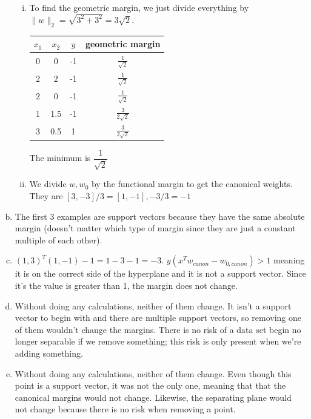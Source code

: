 \documentclass[12pt]{article}
\begin{document}
\begin{enumerate}[(a)]
\begin{enumerate}[i.]
			\item To find the geometric margin, we just divide everything by $ \|w\|_{2} = \sqrt{3^2 + 3^2}  = 3\sqrt{2}$.
			\begin{table}[H]
				\centering
				\begin{tabular}{|c|c|c|c|}
					\hline 
					$x_1$ & $ x_2 $ & $ y $ & geometric margin\\\hline
					\hline
					0 & 0 & -1 & $ \frac{1}{\sqrt{2}} $\\\hline
					2 & 2 & -1 & $ \frac{1}{\sqrt{2}} $\\\hline
					2 & 0 & -1 & $ \frac{1}{\sqrt{2}} $\\\hline
					1 & 1.5 & -1 & $ \frac{3}{2\sqrt{2}} $\\\hline
					3 & 0.5 & 1 & $ \frac{3}{2\sqrt{2}} $\\\hline				
				\end{tabular}
			\end{table}
			The minimum is $ \dfrac{1}{\sqrt{2}} $
			
			\item We divide $ w, w_0 $ by the functional margin to get the canonical weights. They are $ [3, -3]/3 = [1, -1], -3/3 = -1 $		
		\end{enumerate}
	
		\item The first 3 examples are support vectors because they have the same absolute margin (doesn't matter which type of margin since they are just a constant multiple of each other).
		
		\item $ (1,3)^T(1,-1) - 1 = 1 -3 -1 = -3 $. $ y(x^Tw_{canon} - w_{0, canon}) > 1 $ meaning it is on the correct side of the hyperplane and it is not a support vector. Since it's the value is greater than 1, the margin does not change.
		
		\item Without doing any calculations, neither of them change. It isn't a support vector to begin with and there are multiple support vectors, so removing one of them wouldn't change the margins. There is no risk of a data set begin no longer separable if we remove something; this risk is only present when we're adding something.
		
		\item Without doing any calculations, neither of them change. Even though this point is a support vector, it was not the only one, meaning that that the canonical margins would not change. Likewise, the separating plane would not change because there is no risk when removing a point.
		

\end{enumerate}
\end{document}
